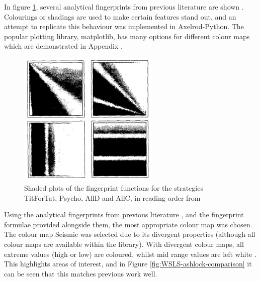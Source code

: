 In figure \ref{fig:ashlock-fingerprints}, several analytical fingerprints from previous literature are shown \cite{Ashlock2004, Ashlock2008}.
Colourings or shadings are used to make certain features stand out, and an attempt to replicate this behaviour was implemented in Axelrod-Python.
The popular plotting library, matplotlib, has many options for different colour maps which are demonstrated in Appendix . %

\begin{figure}[hbtp!]
    \begin{center}
        \includegraphics[width = 0.6\textwidth]{../img/MultipleFingerprintsAshlock}
    \end{center}
    \caption{Shaded plots of the fingerprint functions for the strategies TitForTat, Psycho, AllD and AllC, in reading order from \cite{Ashlock2004}}
    \label{fig:ashlock-fingerprints}
\end{figure}

Using the analytical fingerprints from previous literature \cite{Ashlock2004, Ashlock2008}, and the fingerprint formulae provided alongside them, the most appropriate colour map was chosen.
The colour map Seismic \cite{matplotlib-colormap} was selected due to its divergent properties (although all colour maps are available within the library).
With divergent colour maps, all extreme values (high or low) are coloured, whilst mid range values are left white \cite{Moreland2009}.
This highlights areas of interest, and in Figure \ref{fig:WSLS-ashlock-comparison} it can be seen that this matches previous work well.

